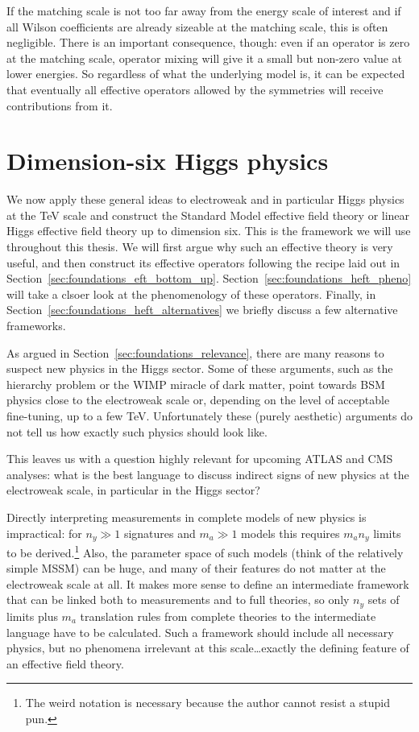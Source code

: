 If the matching scale is not too far away from the energy scale of
interest and if all Wilson coefficients are already sizeable at the
matching scale, this is often negligible. There is an important
consequence, though: even if an operator is zero at the matching
scale, operator mixing will give it a small but non-zero value at
lower energies. So regardless of what the underlying model is, it can
be expected that eventually all effective operators allowed by the
symmetries will receive contributions from it. 



\section{Dimension-six Higgs physics}
\label{sec:foundations_higgs_eft}

We now apply these general ideas to electroweak and in particular
Higgs physics at the TeV scale and construct the Standard Model
effective field theory or linear Higgs effective field theory up to
dimension six. This is the framework we will use throughout this
thesis. We will first argue why such an effective theory is very
useful, and then construct its effective operators following the
recipe laid out in
Section~\ref{sec:foundations_eft_bottom_up}. Section~\ref{sec:foundations_heft_pheno}
will take a clsoer look at the phenomenology of these
operators. Finally, in Section~\ref{sec:foundations_heft_alternatives}
we briefly discuss a few alternative frameworks.

\newparagraph
%
As argued in Section~\ref{sec:foundations_relevance}, there are many
reasons to suspect new physics in the Higgs sector. Some of these
arguments, such as the hierarchy problem or the WIMP miracle of dark
matter, point towards BSM physics close to the electroweak scale or,
depending on the level of acceptable fine-tuning, up to a few
TeV. Unfortunately these (purely aesthetic) arguments do not tell us
how exactly such physics should look like.

This leaves us with a question highly relevant for upcoming ATLAS and
CMS analyses: what is the best language to discuss indirect signs of
new physics at the electroweak scale, in particular in the Higgs
sector?

Directly interpreting measurements in complete models of new physics
is impractical: for $n_y \gg 1$ signatures and $m_a \gg 1$ models this
requires $m_a n_y$ limits to be derived.\footnote{The weird notation
  is necessary because the author cannot resist a stupid pun.} Also,
the parameter space of such models (think of the relatively simple
MSSM) can be huge, and many of their features do not matter at the
electroweak scale at all. It makes more sense to define an
intermediate framework that can be linked both to measurements and to
full theories, so only $n_y$ sets of limits plus $m_a$ translation
rules from complete theories to the intermediate language have to be
calculated. Such a framework should include all necessary physics, but
no phenomena irrelevant at this scale\dots exactly the defining
feature of an effective field theory.




